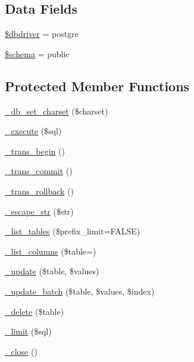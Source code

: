 \subsection*{Data Fields}
\begin{DoxyCompactItemize}
\item 
\mbox{\hyperlink{class_c_i___d_b__postgre__driver_a0cde2a16322a023d040aa7f725877597}{\$dbdriver}} = \textquotesingle{}postgre\textquotesingle{}
\item 
\mbox{\hyperlink{class_c_i___d_b__postgre__driver_a83022b1d70799d2bde3d64dca9cb40ee}{\$schema}} = \textquotesingle{}public\textquotesingle{}
\end{DoxyCompactItemize}
\subsection*{Protected Member Functions}
\begin{DoxyCompactItemize}
\item 
\mbox{\hyperlink{class_c_i___d_b__postgre__driver_a2b808d420d8e9fea0b73ad7127f5efb8}{\+\_\+db\+\_\+set\+\_\+charset}} (\$charset)
\item 
\mbox{\hyperlink{class_c_i___d_b__postgre__driver_a114ab675d89bf8324a41785fb475e86d}{\+\_\+execute}} (\$sql)
\item 
\mbox{\hyperlink{class_c_i___d_b__postgre__driver_ac81ac882c1d54347d810199a15856aac}{\+\_\+trans\+\_\+begin}} ()
\item 
\mbox{\hyperlink{class_c_i___d_b__postgre__driver_a6fe7f373e0b11cfae23a5f41c0b35dda}{\+\_\+trans\+\_\+commit}} ()
\item 
\mbox{\hyperlink{class_c_i___d_b__postgre__driver_ad49a116b0776c26b53114c9093fd102a}{\+\_\+trans\+\_\+rollback}} ()
\item 
\mbox{\hyperlink{class_c_i___d_b__postgre__driver_af8ef0237bfcdb19215b63fff769e7a55}{\+\_\+escape\+\_\+str}} (\$str)
\item 
\mbox{\hyperlink{class_c_i___d_b__postgre__driver_a435c0f3ce54fe7daa178baa8532ebd54}{\+\_\+list\+\_\+tables}} (\$prefix\+\_\+limit=F\+A\+L\+SE)
\item 
\mbox{\hyperlink{class_c_i___d_b__postgre__driver_a7ccb7f9c301fe7f0a9db701254142b63}{\+\_\+list\+\_\+columns}} (\$table=\textquotesingle{}\textquotesingle{})
\item 
\mbox{\hyperlink{class_c_i___d_b__postgre__driver_a2540b03a93fa73ae74c10d0e16fc073e}{\+\_\+update}} (\$table, \$values)
\item 
\mbox{\hyperlink{class_c_i___d_b__postgre__driver_a336b9ebb119e47b6a84bb7fc9d4dae93}{\+\_\+update\+\_\+batch}} (\$table, \$values, \$index)
\item 
\mbox{\hyperlink{class_c_i___d_b__postgre__driver_a133ea8446ded52589bd22cc9163d0896}{\+\_\+delete}} (\$table)
\item 
\mbox{\hyperlink{class_c_i___d_b__postgre__driver_a3a02ea06541b8ecc25a33a61651562c8}{\+\_\+limit}} (\$sql)
\item 
\mbox{\hyperlink{class_c_i___d_b__postgre__driver_a4d9082658000e5ede8312067c6dda9db}{\+\_\+close}} ()
\end{DoxyCompactItemize}
